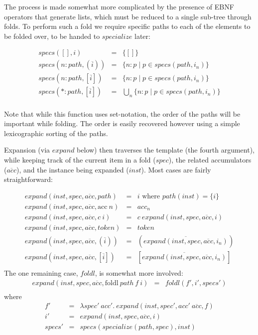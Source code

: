 \documentclass{kththesis}
\begin{document}
The process is made somewhat more complicated by the presence of EBNF operators that generate lists, which must be reduced to a single sub-tree through folds. To perform such a fold we require specific paths to each of the elements to be folded over, to be handed to $specialize$ later:

$$
\begin{array}{rcl}
specs([], i) & = & \{[]\} \\
specs(n:path, (\overline{i})) & = & \{n : p \mid p \in specs(path, i_n)\} \\
specs(n:path, [\overline{i}]) & = & \{n : p \mid p \in specs(path, i_n)\} \\
specs(*:path, [\overline{i}]) & = & \bigcup\limits_{n} \{n:p \mid p \in specs(path, i_n)\} \\
\end{array}
$$

Note that while this function uses set-notation, the order of the paths will be important while folding. The order is easily recovered however using a simple lexicographic sorting of the paths.

Expansion (via $expand$ below) then traverses the template (the fourth argument), while keeping track of the current item in a fold ($spec$), the related accumulators ($\overline{acc}$), and the instance being expanded ($inst$). Most cases are fairly straightforward:

$$
\begin{array}{rcl}
expand(inst, spec, \overline{acc}, path) & = & i \text{ where } path(inst) = \{i\} \\
expand(inst, spec, \overline{acc}, \text{acc}~n) & = & acc_n \\
expand(inst, spec, \overline{acc}, c~i) & = & c~expand(inst, spec, \overline{acc}, i) \\
expand(inst, spec, \overline{acc}, token) & = & token \\
expand(inst, spec, \overline{acc}, (\overline{i})) & = & (\overline{expand(inst, spec, \overline{acc}, i_n)}) \\
expand(inst, spec, \overline{acc}, [\overline{i}]) & = & [\overline{expand(inst, spec, \overline{acc}, i_n)}] \\
\end{array}
$$
The one remaining case, $foldl$, is somewhat more involved:
$$
\begin{array}{rcl}
expand(inst, spec, \overline{acc}, \text{foldl}~path~f~i) & = & foldl(f', i', specs') \\
\end{array}
$$
where
$$
\begin{array}{rcl}
f' & = & \lambda spec'~acc'.~ expand(inst, spec', acc'~\overline{acc}, f) \\
i' & = & expand(inst, spec, \overline{acc}, i) \\
specs' & = & specs(specialize(path, spec), inst) \\
\end{array}
$$
\end{document}
